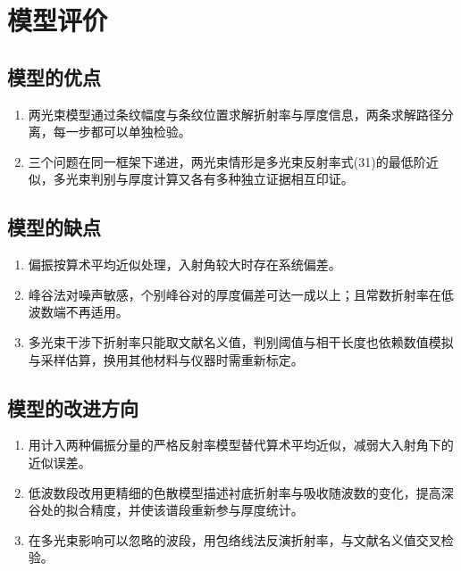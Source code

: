 \section{模型评价}

\subsection{模型的优点}

\begin{enumerate}
\item 两光束模型通过条纹幅度与条纹位置求解折射率与厚度信息，两条求解路径分离，每一步都可以单独检验。
\item 三个问题在同一框架下递进，两光束情形是多光束反射率式(31)的最低阶近似，多光束判别与厚度计算又各有多种独立证据相互印证。
\end{enumerate}

\subsection{模型的缺点}

\begin{enumerate}
\item 偏振按算术平均近似处理，入射角较大时存在系统偏差。
\item 峰谷法对噪声敏感，个别峰谷对的厚度偏差可达一成以上；且常数折射率在低波数端不再适用。
\item 多光束干涉下折射率只能取文献名义值，判别阈值与相干长度也依赖数值模拟与采样估算，换用其他材料与仪器时需重新标定。
\end{enumerate}

\subsection{模型的改进方向}

\begin{enumerate}
\item 用计入两种偏振分量的严格反射率模型替代算术平均近似，减弱大入射角下的近似误差。
\item 低波数段改用更精细的色散模型描述衬底折射率与吸收随波数的变化，提高深谷处的拟合精度，并使该谱段重新参与厚度统计。
\item 在多光束影响可以忽略的波段，用包络线法反演折射率，与文献名义值交叉检验。
\end{enumerate}
